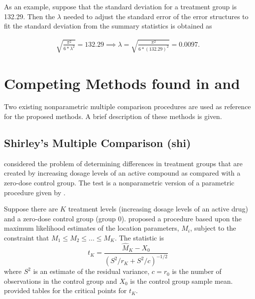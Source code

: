  As an example, suppose that the standard deviation for a treatment group is 132.29. Then the $\lambda$ needed to adjust the standard error of the error structures to fit the standard deviation from the summary statistics is obtained  as 

\begin{eqnarray*}
\sqrt{\frac{\pi^{2}}{6*\lambda^2}} = 132.29 \implies \lambda = \sqrt{\frac{\pi^{2}}{6*(132.29)^2}} = 0.0097.
\end{eqnarray*}

\section{Competing Methods found in \cite{jan_shieh} and \cite{Shirley}}
\label{sec: Appendix B}
Two existing nonparametric multiple comparison procedures are used as reference for the proposed methods. A brief description of these methods is given.
%
\subsection{Shirley's Multiple Comparison (shi)} \label{shi}
\citep{Shirley}  considered the problem of determining differences in treatment groups that are created by increasing dosage levels of an active compound as compared with a zero-dose control group. The test is a nonparametric version of a parametric procedure given by \cite{Williams}. 

Suppose there are $K$  treatment levels (increasing dosage levels of an active drug) and a zero-dose control group (group 0). \cite{Williams} proposed a procedure based upon the maximum likelihood estimates of the location parameters, $M_i$, subject to the constraint that $M_1 \leq M_2 \leq ... \leq M_K$. The statistic is
$$ t_K=\frac{\hat{M}_K - X_0}{\left(S^2/r_K + S^2/c\right)^{-1/2}}  $$
where $S^2$ is an estimate of the residual variance, $c=r_0$ is the number of observations in the control group and $X_0$ is the control group sample mean. \cite{Williams} provided tables for the critical points for $t_K.$ 

